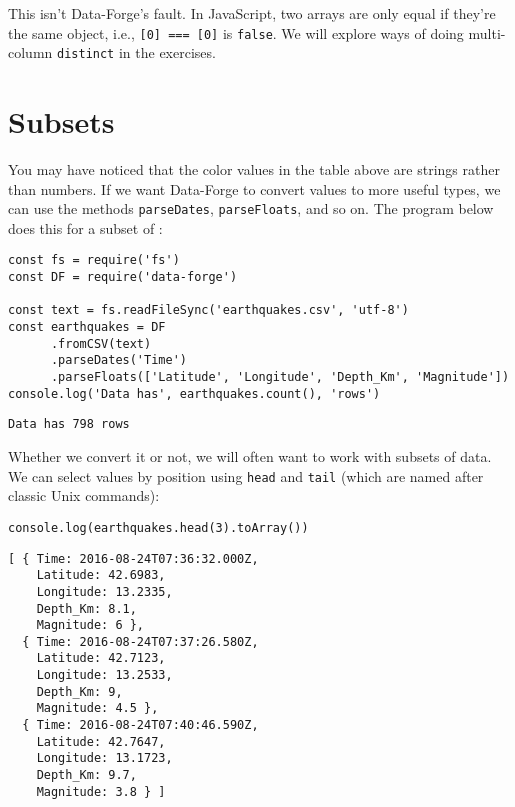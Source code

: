 This isn't Data-Forge's fault.
In JavaScript,
two arrays are only equal if they're the same object,
i.e., \texttt{[0] === [0]} is \texttt{false}.
We will explore ways of doing multi-column \texttt{distinct} in the exercises.

\section{Subsets}\label{s:dataforge-subset}

You may have noticed that the color values in the table above are strings rather than numbers.
If we want Data-Forge to convert values to more useful types,
we can use the methods \texttt{parseDates}, \texttt{parseFloats}, and so on.
The program below does this for a subset of
:

\begin{verbatim}
const fs = require('fs')
const DF = require('data-forge')

const text = fs.readFileSync('earthquakes.csv', 'utf-8')
const earthquakes = DF
      .fromCSV(text)
      .parseDates('Time')
      .parseFloats(['Latitude', 'Longitude', 'Depth_Km', 'Magnitude'])
console.log('Data has', earthquakes.count(), 'rows')
\end{verbatim}

\begin{verbatim}
Data has 798 rows
\end{verbatim}

Whether we convert it or not,
we will often want to work with subsets of data.
We can select values by position using \texttt{head} and \texttt{tail}
(which are named after classic Unix commands):

\begin{verbatim}
console.log(earthquakes.head(3).toArray())
\end{verbatim}

\begin{verbatim}
[ { Time: 2016-08-24T07:36:32.000Z,
    Latitude: 42.6983,
    Longitude: 13.2335,
    Depth_Km: 8.1,
    Magnitude: 6 },
  { Time: 2016-08-24T07:37:26.580Z,
    Latitude: 42.7123,
    Longitude: 13.2533,
    Depth_Km: 9,
    Magnitude: 4.5 },
  { Time: 2016-08-24T07:40:46.590Z,
    Latitude: 42.7647,
    Longitude: 13.1723,
    Depth_Km: 9.7,
    Magnitude: 3.8 } ]
\end{verbatim}


